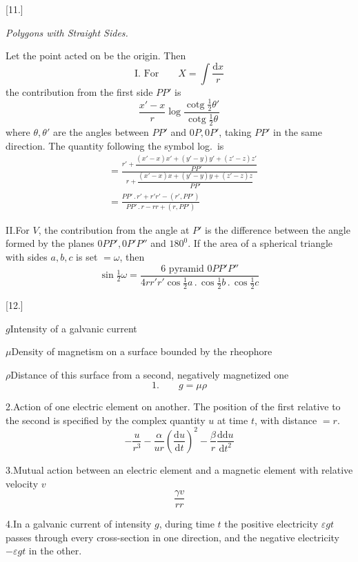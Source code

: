 \begin{center}[11.]\par\medskip\textit{Polygons with Straight Sides.}\end{center}
Let the point acted on be the origin. Then
\[
\text{I. For}\qquad X=\int\frac{\mathrm dx}{r}
\]
the contribution from the first side $PP'$ is
\[
\frac{x'-x}{r}\log\frac{\operatorname{cotg}\tfrac{1}{2}\theta'}{\operatorname{cotg}\tfrac{1}{2}\theta}
\]
where $\theta,\theta'$ are the angles between $PP'$ and $0P,0P'$, taking $PP'$ in the same direction. The quantity following the symbol log.\ is
\[
\begin{aligned}
&=\frac{r'+\dfrac{(x'-x)x'+(y'-y)y'+(z'-z)z'}{PP'}}{r+\dfrac{(x'-x)x+(y'-y)y+(z'-z)z}{PP'}}\\[6pt]
&=\frac{PP'\,.\,r'+r'r'-(r',PP')}{PP'\,.\,r-rr+(r,PP')}
\end{aligned}
\]

II.\quad For $V$, the contribution from the angle at $P'$ is the difference between the angle formed by the planes $0PP',0P'P''$ and $180^0$. If the area of a spherical triangle with sides $a,b,c$ is set $=\omega$, then
\[
\sin\tfrac{1}{2}\omega=\frac{6\text{ pyramid }0PP'P''}{4rr'r'\cos\tfrac{1}{2}a\,.\,\cos\tfrac{1}{2}b\,.\,\cos\tfrac{1}{2}c}
\]
\begin{center}[12.]\end{center}
\noindent$g$\quad Intensity of a galvanic current\par
\noindent$\mu$\quad Density of magnetism on a surface bounded by the rheophore\par
\noindent$\rho$\quad Distance of this surface from a second, negatively magnetized one
\[
\text{1.}\qquad g=\mu\rho
\]

2.\quad Action of one electric element on another. The position of the first relative to the second is specified by the complex quantity $u$ at time $t$, with distance $=r$.
\[
-\frac{u}{r^3}-\frac{\alpha}{ur}\left(\frac{\mathrm du}{\mathrm dt}\right)^2-\frac{\beta}{r}\frac{\mathrm d\mathrm du}{\mathrm dt^2}
\]

3.\quad Mutual action between an electric element and a magnetic element with relative velocity $v$
\[
\frac{\gamma v}{rr}
\]

4.\quad In a galvanic current of intensity $g$, during time $t$ the positive electricity $\varepsilon gt$ passes through every cross-section in one direction, and the negative electricity $-\varepsilon gt$ in the other.

